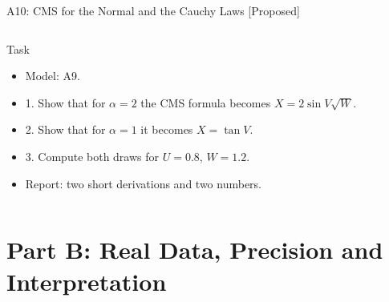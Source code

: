 \begin{frame}{A10: CMS for the Normal and the Cauchy Laws [Proposed]}
\propsub
\itemsize{\footnotesize}
\begin{columns}[T]
\begin{column}{\taskw}
\begin{block}{Task}
\begin{itemize}
    \item Model: A9.
    \item 1. Show that for $\alpha = 2$ the CMS formula becomes $X = 2\sin V\sqrt{W}$.
    \item 2. Show that for $\alpha = 1$ it becomes $X = \tan V$.
    \item 3. Compute both draws for $U = 0.8$, $W = 1.2$.
    \item Report: two short derivations and two numbers.
\end{itemize}
\end{block}
\end{column}
\begin{column}{\solw}
\end{column}
\end{columns}
\end{frame}


\section{Part B: Real Data, Precision and Interpretation}

